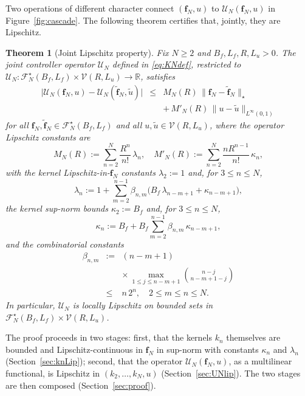 \documentclass[10pt,a4paper]{amsart}
\newcommand{\R}{\mathbb{R}}
\newcommand{\Linf}{L^\infty}
\newtheorem{theorem}{Theorem}
\begin{document}
Two operations of different character connect $(\mathbf{f}_N, u)$ to $\mathcal{U}_N(\mathbf{f}_N, u)$ in Figure~\ref{fig:cascade}. The following theorem certifies that, jointly, they are Lipschitz.

\begin{theorem}[Joint Lipschitz property]
\label{thm:main}
Fix $N\ge 2$ and $B_f, L_f, R, L_u > 0$. The joint controller operator $\mathcal{U}_N$ defined in \eqref{eq:KNdef}, restricted to $\mathcal{U}_N \colon \mathcal{F}_N^\star(B_f,L_f) \times \mathcal{V}(R,L_u) \to \R$, satisfies
\begin{eqnarray}
\bigl|\mathcal{U}_N(\mathbf{f}_N,u) - \mathcal{U}_N(\tilde{\mathbf{f}}_N,\tilde u)\bigr| &\le& M_N(R)\,\|\mathbf{f}_N-\tilde{\mathbf{f}}_N\|_\star \nonumber \\
&& +\, M'_N(R)\,\|u-\tilde u\|_{\Linf(0,1)}
\label{eq:joint-Lip}
\end{eqnarray}
for all $\mathbf{f}_N,\tilde{\mathbf{f}}_N\in\mathcal{F}_N^\star(B_f,L_f)$ and all $u,\tilde u\in\mathcal{V}(R,L_u)$, where the operator Lipschitz constants are
\begin{equation}
M_N(R) := \sum_{n=2}^N \frac{R^n}{n!}\,\lambda_n, \quad M'_N(R) := \sum_{n=2}^N \frac{n R^{n-1}}{n!}\,\kappa_n,
\label{eq:M-def}
\end{equation}
with the kernel Lipschitz-in-$\mathbf{f}_N$ constants $\lambda_2 := 1$ and, for $3\le n\le N$,
\begin{equation}
\lambda_n := 1 + \sum_{m=2}^{n-1} \beta_{n,m}\bigl(B_f\,\lambda_{n-m+1} + \kappa_{n-m+1}\bigr),
\label{eq:lambda-def}
\end{equation}
the kernel sup-norm bounds $\kappa_2 := B_f$ and, for $3\le n\le N$,
\begin{equation}
\kappa_n := B_f + B_f\sum_{m=2}^{n-1} \beta_{n,m}\,\kappa_{n-m+1},
\label{eq:kappa-def}
\end{equation}
and the combinatorial constants
\begin{eqnarray}
\beta_{n,m} &:=& (n-m+1) \nonumber \\
&& \times\, \max_{1\le j\le n-m+1}\binom{n-j}{n-m+1-j} \nonumber \\
&\le& n\,2^n, \quad 2\le m\le n\le N.
\label{eq:beta-def}
\end{eqnarray}
In particular, $\mathcal{U}_N$ is locally Lipschitz on bounded sets in $\mathcal{F}_N^\star(B_f,L_f)\times\mathcal{V}(R,L_u)$.
\end{theorem}

The proof proceeds in two stages: first, that the kernels $k_n$ themselves are bounded and Lipschitz-continuous in $\mathbf{f}_N$ in sup-norm with constants $\kappa_n$ and $\lambda_n$ (Section~\ref{sec:knLip}); second, that the operator $\mathcal{U}_N(\mathbf{f}_N, u)$, as a multilinear functional, is Lipschitz in $(k_2, \ldots, k_N, u)$ (Section~\ref{sec:UNlip}). The two stages are then composed (Section~\ref{sec:proof}).
\end{document}
